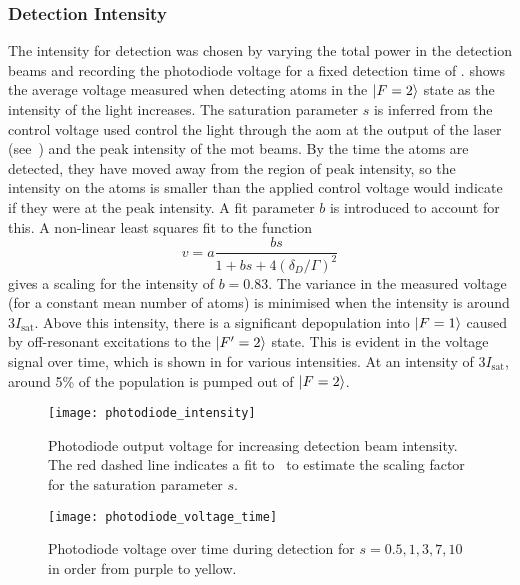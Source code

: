 \subsubsection{Detection Intensity}
The intensity for detection was chosen by varying the total power
in the detection beams and recording the photodiode voltage for a
fixed detection time of .
 shows the average voltage
measured when detecting atoms in the \(\ket{F=2}\) state as the
intensity of the light increases. The saturation parameter \(s\) is
inferred from the control voltage used control the light
through the \ac{aom} at the output of the
\Muquans laser (see~) and the peak
intensity of the \ac{mot} beams. By the time the atoms are detected,
they have moved away from the region of peak intensity, so the
intensity on the atoms is smaller than the applied control voltage
would indicate if they were at the peak intensity. A fit parameter $b$
is introduced to account for this. A non-linear least squares fit
to the function
\begin{equation}
  v = a\frac{b s}{1 + b s + 4 \left(\delta_D/\Gamma\right)^2}
  \label{eq:voltage_fit}
\end{equation}
gives a scaling for the intensity of \(b = 0.83\). The variance in the
measured voltage (for a constant mean number of atoms) is minimised when the
intensity is around 3\(I_\text{sat}\). Above this intensity, there is
a significant depopulation into \(\ket{F=1}\) caused by off-resonant
excitations to the \(\ket{F'=2}\) state.
This is evident in the voltage signal over time, which is
shown in  for various intensities. At an
intensity of 3\(I_\text{sat}\), around 5\% of the population is
pumped out of \(\ket{F=2}\).
\begin{figure}[htpb!]
  \centering
  \texttt{[image: photodiode\_intensity]}
  \caption[Photodiode output voltage for increasing detection beam
  intensity. ]{Photodiode output voltage for increasing detection beam
  intensity. The red dashed line indicates a fit
to~ to estimate the scaling factor for the
saturation parameter \(s\).}
  \label{fig:photodiode_intensity_calib}
\end{figure}

\begin{figure}[htpb!]
  \centering
  \texttt{[image: photodiode\_voltage\_time]}
  \caption[Photodiode voltage for varying detection times.]{Photodiode voltage over time during detection for \(s =
    0.5, 1, 3, 7, 10\) in order from purple to yellow.}
  \label{fig:detection_time}
\end{figure}


